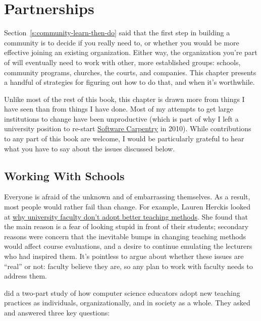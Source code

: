 \chapter{Partnerships}\label{s:partner}

Section~\ref{s:community-learn-then-do} said that the first step in
building a community is to decide if you really need to, or whether you
would be more effective joining an existing organization. Either way,
the organization you're part of will eventually need to work with other,
more established groups: schools, community programs, churches, the
courts, and companies. This chapter presents a handful of strategies for
figuring out how to do that, and when it's worthwhile.

Unlike most of the rest of this book, this chapter is drawn more from
things I have seen than from things I have done. Most of my attempts
to get large institutions to change have been unproductive (which is
part of why I left a university position to re-start \href{http://software-carpentry.org}{Software
Carpentry} in 2010). While contributions to any part of this book
are welcome, I would be particularly grateful to hear what you have to
say about the issues discussed below.

\section{Working With Schools}\label{s:partner-schools}

Everyone is afraid of the unknown and of embarrassing themselves. As a
result, most people would rather fail than change. For example, Lauren
Herckis looked at \href{https://www.insidehighered.com/news/2017/07/06/anthropologist-studies-why-professors-dont-adopt-innovative-teaching-methods}{why university faculty don't adopt better teaching
methods}. She found that the main
reason is a fear of looking stupid in front of their students;
secondary reasons were concern that the inevitable bumps in changing
teaching methods would affect course evaluations, and a desire to
continue emulating the lecturers who had inspired them. It's pointless
to argue about whether these issues are ``real'' or not: faculty believe
they are, so any plan to work with faculty needs to address them.

\cite{Bark2015} did a two-part study of how computer science
educators adopt new teaching practices as individuals, organizationally,
and in society as a whole. They asked and answered three key questions:

